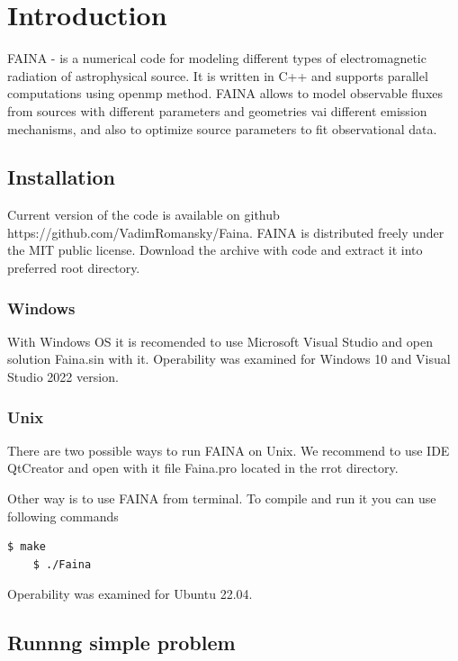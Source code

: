 \chapter*{Introduction}		
FAINA - is a numerical code for modeling different types of electromagnetic radiation of astrophysical source. It is written in C++ and supports parallel computations using openmp method. FAINA allows to model observable fluxes from sources with different parameters and geometries vai different emission mechanisms, and also to optimize source parameters to fit observational data.

\section*{Installation}
Current version of the code is available on github https://github.com/VadimRomansky/Faina. FAINA is distributed freely under the MIT public license. Download the archive with code and extract it into preferred root directory.

\subsection*{Windows}
With Windows OS it is recomended to use Microsoft Visual Studio and open solution Faina.sin with it. Operability was examined for Windows 10 and Visual Studio 2022 version.

\subsection*{Unix}
There are two possible ways to run FAINA on Unix. We recommend to use IDE QtCreator and open  with it file Faina.pro located in the rrot directory.

Other way is to use FAINA from terminal. To compile and run it you can use following commands

\begin{lstlisting}[language=bash]
	$ make
	$ ./Faina
\end{lstlisting}

Operability was examined for Ubuntu 22.04.

\section*{Runnng simple problem}\label{running}

